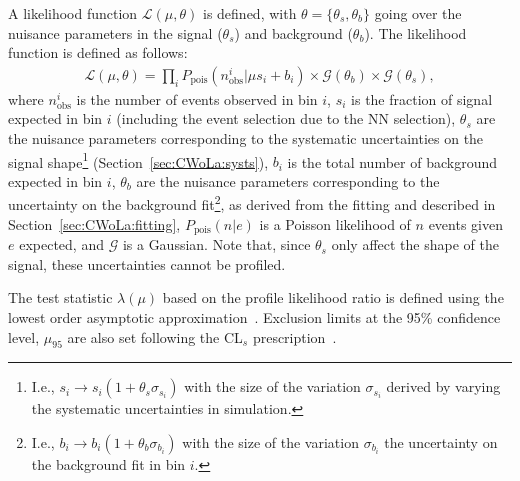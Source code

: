 A likelihood function $\mathcal{L}(\mu,\theta)$ is defined, with $\theta=\{\theta_s,\theta_b\}$ going over the nuisance parameters in the signal ($\theta_s$) and background ($\theta_b$).
The likelihood function is defined as follows:
\begin{align}
  \mathcal{L}(\mu,\theta) = \prod_i P_\text{pois}(n_\text{obs}^i|\mu s_i + b_i)\times\mathcal{G}(\theta_b)\times\mathcal{G}(\theta_s),
  \label{eqn:CWoLa:likelihood}
\end{align}
where $n_\text{obs}^i$ is the number of events observed in bin $i$,
$s_i$ is the fraction of signal expected in bin $i$ (including the event selection due to the NN selection),
$\theta_s$ are the nuisance parameters corresponding to the systematic uncertainties on the signal shape\footnote{I.e., $s_i \rightarrow s_i(1+\theta_s\sigma_{s_i})$ with the size of the variation $\sigma_{s_i}$ derived by varying the systematic uncertainties in simulation.}
(Section~\ref{sec:CWoLa:systs}),
$b_i$ is the total number of background expected in bin $i$,
$\theta_b$ are the nuisance parameters corresponding to the uncertainty on the background fit\footnote{I.e., $b_i \rightarrow b_i(1+\theta_b\sigma_{b_i})$ with the size of the variation $\sigma_{b_i}$ the uncertainty on the background fit in bin $i$.},
as derived from the fitting and described in Section~\ref{sec:CWoLa:fitting},
$P_\text{pois}(n|e)$ is a Poisson likelihood of $n$ events given $e$ expected, and $\mathcal{G}$ is a Gaussian.
Note that, since $\theta_s$ only affect the shape of the signal, these uncertainties cannot be profiled.

The test statistic $\lambda(\mu)$ based on the profile likelihood ratio is defined using the lowest order asymptotic approximation~\cite{Cowan:2010js}.
Exclusion limits at the 95\% confidence level, $\mu_{95}$ are also set following the CL$_s$ prescription~\cite{Read:2002hq}.

